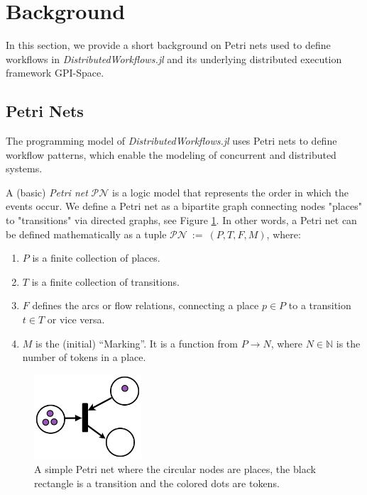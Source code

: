 \documentclass{juliacon}
\begin{document}
\section{Background}
\label{sec:background}

In this section, we provide a short background on Petri nets used to define workflows in \emph{DistributedWorkflows.jl} and its underlying distributed execution framework GPI-Space.

\subsection{Petri Nets}
\label{sec:petri_nets}

The programming model of \emph{DistributedWorkflows.jl} uses Petri nets to define workflow patterns, which enable the modeling of concurrent and distributed systems.\vskip 6pt

A (basic) \emph{Petri net} $\mathcal{PN}$ is a logic model that represents the order in which the events occur. 
We define a Petri net as a bipartite graph connecting nodes "places" to "transitions" via directed graphs, see Figure \ref{basic_petri_net}. 
In other words, a Petri net can be defined mathematically as a tuple $\mathcal{PN}~:=~(P, T, F, M)$, where:
\begin{enumerate}
    \item $P$ is a finite collection of places.
    \item $T$ is a finite collection of transitions.
    \item $F$ defines the arcs or flow relations, connecting a place $p \in P$ to a transition $t \in T$ or vice versa.
    \item $M$ is the (initial) “Marking”. It is a function from $P \rightarrow N$, where $N \in \mathbb{N}$ is the number of tokens in a place.
\end{enumerate}

\begin{figure}[h]
    \centerline{\includegraphics[width=4cm]{basic_petri_net.png}}
    \caption{A simple Petri net where the circular nodes are places, the black rectangle is a transition and the colored dots are tokens.}
    \label{basic_petri_net}
\end{figure}
\end{document}
